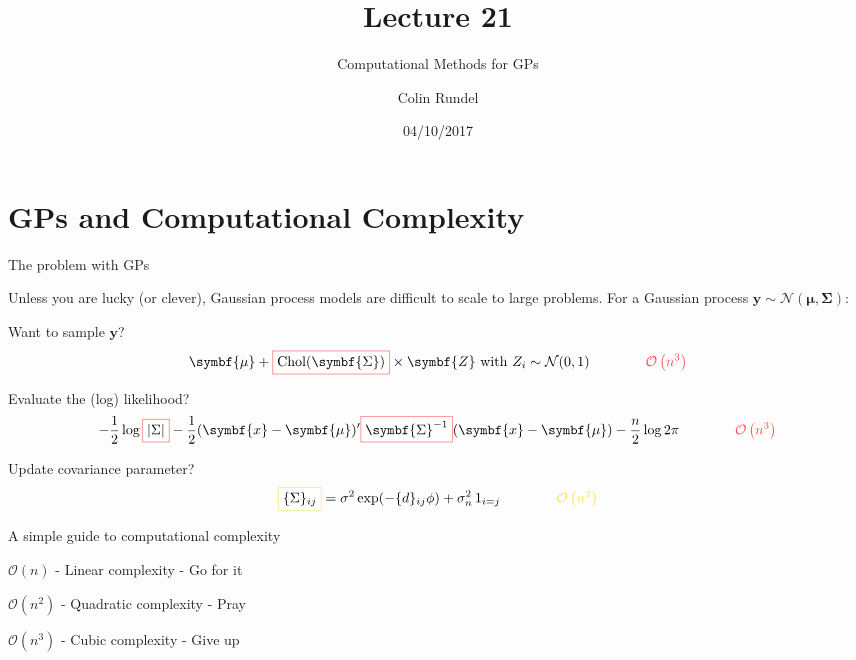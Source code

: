 \documentclass[11pt,ignorenonframetext,]{beamer}
\title{Lecture 21}
\subtitle{Computational Methods for GPs}
\author{Colin Rundel}
\date{04/10/2017}
\newcommand{\hlr}[1]{\fcolorbox{redhl}{white}{$\displaystyle #1$}}
\newcommand{\hly}[1]{\fcolorbox{yellowhl}{white}{$\displaystyle #1$}}
\begin{document}
\frame{\titlepage}

\hypertarget{gps-and-computational-complexity}{%
\section{GPs and Computational
Complexity}\label{gps-and-computational-complexity}}

\begin{frame}{The problem with GPs}
\protect\hypertarget{the-problem-with-gps}{}

Unless you are lucky (or clever), Gaussian process models are difficult
to scale to large problems. For a Gaussian process
\(\symbf{y} \sim \mathcal{N}(\symbf{\mu},\symbf{\Sigma})\):

\pause

\vspace{3mm}

Want to sample \(\symbf{y}\)?
\[ \symbf{\mu} + \hlr{\text{Chol}(\symbf{\Sigma})} \times \symbf{Z} \text{ with } Z_i \sim \mathcal{N}(0,1) \qquad \qquad \color{redhl}{\mathcal{O}\left(n^3\right)} \]

\pause

Evaluate the (log) likelihood?
\[ -\frac{1}{2} \log \hlr{|\Sigma|} - \frac{1}{2} (\symbf{x}-\symbf{\mu})' \hlr{\symbf{\Sigma}^{-1}} (\symbf{x}-\symbf{\mu}) - \frac{n}{2}\log 2\pi \qquad \qquad \color{redhl}{\mathcal{O}\left(n^3\right)}\]

\pause

Update covariance parameter?
\[ \hly{\{\Sigma\}_{ij}} = \sigma^2 \exp(-\{d\}_{ij}\phi) + \sigma^2_n \, 1_{i=j} \qquad \qquad \color{yellowhl}{\mathcal{O}\left(n^2\right)}\]

\end{frame}

\begin{frame}{A simple guide to computational complexity}
\protect\hypertarget{a-simple-guide-to-computational-complexity}{}

\Large

\begin{center}
\vfill
$\mathcal{O}\left(n\right)$ - Linear complexity \pause- Go for it \pause

\vspace{15mm}

$\mathcal{O}\left(n^2\right)$ - Quadratic complexity \pause- Pray \pause

\vspace{15mm}

$\mathcal{O}\left(n^3\right)$ - Cubic complexity \pause- Give up

\vfill
\end{center}

\end{frame}
\end{document}
